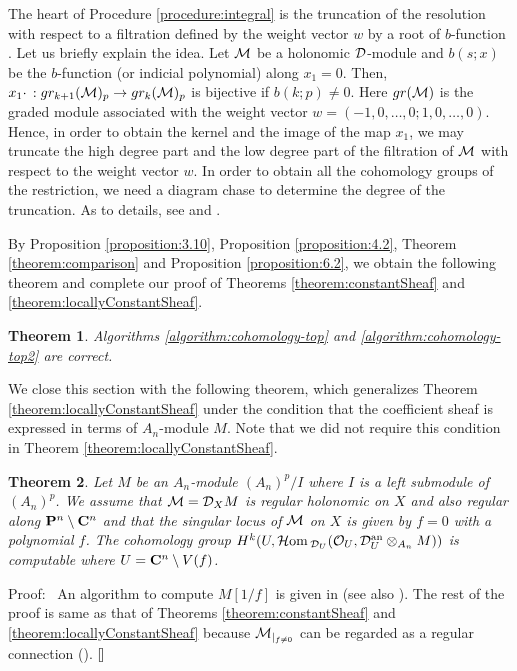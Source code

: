 \documentclass[12pt]{article}
\def\C{{\bf C}}
\def\hol{ {\cal O} }
\def\Hom{ {\cal H}{\rm om}\, }
\def\Dsc{ {\cal D} }
\def\Msc{ {\cal M} }
\newenvironment{proof}{\par\noindent Proof:\ }{${\tt [}\kern-0.2mm{\tt ]}$}
\newtheorem{theorem}{Theorem}[section]
\begin{document}
The heart of Procedure \ref{procedure:integral} is the truncation
of the resolution with respect to a filtration defined by the
weight vector $w$
by a root of $b$-function \cite{OakuAdvance2}.
Let us briefly explain the idea.
Let $\Msc$ be a holonomic $\Dsc$-module and $b(s;x)$ be the $b$-function
(or indicial polynomial) along $x_1=0$.
Then,
$ x_1 \cdot \,: gr_{k+1}(\Msc)_p \rightarrow gr_k(\Msc)_p$
is bijective if $b(k;p)\not=0$.
Here $gr(\Msc)$ is the graded module associated with
the weight vector $w = (-1, 0, \ldots, 0; 1, 0, \ldots, 0)$.
Hence, in order to obtain the kernel and the image of the map $x_1$,
we may truncate the high degree part and the low degree part of the
filtration of $\Msc$ with respect to the weight vector $w$.
In order to obtain all the cohomology groups of the restriction, we need
a diagram chase to determine the degree of the truncation.
As to details, see \cite[section 5]{OakuAdvance} and \cite{OakuAdvance2}.

\bigbreak

By Proposition \ref{proposition:3.10}, Proposition \ref{proposition:4.2},
Theorem \ref{theorem:comparison} and Proposition \ref{proposition:6.2},
we obtain the following theorem and complete our proof
of Theorems \ref{theorem:constantSheaf} and \ref{theorem:locallyConstantSheaf}.


\begin{theorem}
Algorithms \ref{algorithm:cohomology-top} and \ref{algorithm:cohomology-top2}
are correct.
\end{theorem}

We close this section with the following theorem,
which generalizes Theorem \ref{theorem:locallyConstantSheaf}
under the condition that the coefficient sheaf is expressed 
in terms of $A_n$-module $M$.
Note that we did not require this condition in Theorem
\ref{theorem:locallyConstantSheaf}.

\begin{theorem}
Let $M$ be an $A_n$-module 
$ (A_n)^p/ I $ where $I$ is a left submodule of $(A_n)^p$.
We assume that $\Msc = \Dsc_X M$ is regular holonomic on $X$ and
also regular along ${\bf P}^n \setminus {\bf C}^n$ and that
the singular locus of $\Msc$ on $X$ is given by $f=0$
with a polynomial $f$.
The cohomology group
$ H^k(U, \Hom_{\Dsc_U}(\hol_U, \Dsc^{\rm an}_U\otimes_{A_n}M))$
is computable where
$U =\C^n \setminus V(f)$.
\end{theorem}

\begin{proof}
An algorithm to compute
$ M[1/f] $ is given in \cite[Tensor product and localization]{OakuAdvance2}
(see also \cite[Propositions 7.1 and 7.5]{OakuAdvance}).
The rest of the proof is same as that of 
Theorems \ref{theorem:constantSheaf} and
\ref{theorem:locallyConstantSheaf}
because $\Msc_{|_{f \not= 0}}$
can be regarded as a regular connection
(\cite[Theorem 2.3.2]{KKholonomic3}).
\end{proof}
\end{document}
